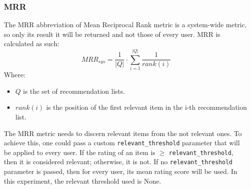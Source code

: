 \documentclass[11pt]{article}
\begin{document}
\subsubsection{MRR}\label{sec:mrr}
The MRR abbreviation of Mean Reciprocal Rank metric is a system-wide metric, so only its result it will be returned
and not those of every user.
MRR is calculated as such:
\hfill\break
\hfill\break
    \[
        MRR_{sys} = \frac{1}{|Q|}\cdot\sum_{i=1}^{|Q|}\frac{1}{rank(i)}
    \]
\hfill\break
\hfill\break
    Where:
\begin{itemize}
    \item $Q$ is the set of recommendation lists.
    \item $rank(i)$ is the position of the first relevant item in the i-th recommendation list.
\end{itemize}
\hfill\break
\hfill\break
The MRR metric needs to discern relevant items from the not relevant ones. To achieve this, one could pass a
custom \texttt{relevant\_threshold} parameter that will be applied to every user. If the rating of an item
is $\geq$ \texttt{relevant\_threshold}, then it is considered relevant; otherwise, it is not.
If no \texttt{relevant\_threshold} parameter is passed, then for every user, its mean rating score will be used.
In this experiment, the relevant threshold used is
None.
\hfill\break
\hfill\break


























\end{document}
